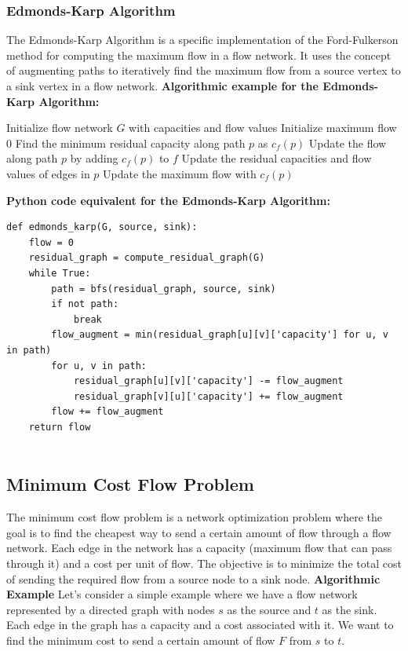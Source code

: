 \documentclass[12pt]{book} %
\begin{document}
\subsubsection{Edmonds-Karp Algorithm}
The Edmonds-Karp Algorithm is a specific implementation of the Ford-Fulkerson method for computing the maximum flow in a flow network. It uses the concept of augmenting paths to iteratively find the maximum flow from a source vertex to a sink vertex in a flow network.
\FloatBarrier
\textbf{Algorithmic example for the Edmonds-Karp Algorithm:}
\FloatBarrier
\begin{algorithm}
\caption{Edmonds-Karp Algorithm}
\begin{algorithmic}[1]
\State Initialize flow network $G$ with capacities and flow values
\State Initialize maximum flow $0$
    \State Find the minimum residual capacity along path $p$ as $c_f(p)$
    \State Update the flow along path $p$ by adding $c_f(p)$ to $f$
    \State Update the residual capacities and flow values of edges in $p$
    \State Update the maximum flow with $c_f(p)$
\EndWhile
\end{algorithmic}
\end{algorithm}
\FloatBarrier
\textbf{Python code equivalent for the Edmonds-Karp Algorithm:}
\FloatBarrier
\begin{lstlisting}
def edmonds_karp(G, source, sink):
    flow = 0
    residual_graph = compute_residual_graph(G)
    while True:
        path = bfs(residual_graph, source, sink)
        if not path:
            break
        flow_augment = min(residual_graph[u][v]['capacity'] for u, v in path)
        for u, v in path:
            residual_graph[u][v]['capacity'] -= flow_augment
            residual_graph[v][u]['capacity'] += flow_augment
        flow += flow_augment
    return flow
        
\end{lstlisting}
\subsection{Minimum Cost Flow Problem}
The minimum cost flow problem is a network optimization problem where the goal is to find the cheapest way to send a certain amount of flow through a flow network. Each edge in the network has a capacity (maximum flow that can pass through it) and a cost per unit of flow. The objective is to minimize the total cost of sending the required flow from a source node to a sink node.
\FloatBarrier
\textbf{Algorithmic Example}
\FloatBarrier
Let's consider a simple example where we have a flow network represented by a directed graph with nodes $s$ as the source and $t$ as the sink. Each edge in the graph has a capacity and a cost associated with it. We want to find the minimum cost to send a certain amount of flow $F$ from $s$ to $t$.
\end{document}
